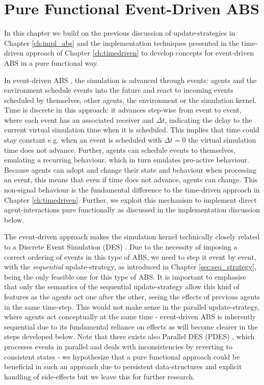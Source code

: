 \chapter{Pure Functional Event-Driven ABS}
\label{ch:eventdriven}

In this chapter we build on the previous discussion of update-strategies in Chapter \ref{ch:impl_abs} and the implementation techniques presented in the time-driven approach of Chapter \ref{ch:timedriven} to develop concepts for event-driven ABS in a pure functional way. 

In event-driven ABS \cite{meyer_event-driven_2014}, the simulation is advanced through events: agents and the environment schedule events into the future and react to incoming events scheduled by themselves, other agents, the environment or the simulation kernel. Time is discrete in this approach: it advances step-wise from event to event, where each event has an associated receiver and $\Delta t$, indicating the delay to the current virtual simulation time when it is scheduled. This implies that time could stay constant e.g. when an event is scheduled with $\Delta t = 0$ the virtual simulation time does not advance. Further, agents can schedule events to themselves, emulating a recurring behaviour, which in turn emulates pro-active behaviour. Because agents can adopt and change their state and behaviour when processing an event, this means that even if time does not advance, agents can change. This non-signal behaviour is the fundamental difference to the time-driven approach in Chapter \ref{ch:timedriven}. Further, we exploit this mechanism to implement direct agent-interactions pure functionally as discussed in the implementation discussion below.

The event-driven approach makes the simulation kernel technically closely related to a Discrete Event Simulation (DES) \cite{zeigler_theory_2000}. Due to the necessity of imposing a correct ordering of events in this type of ABS, we need to step it event by event, with the \textit{sequential} update-strategy, as introduced in Chapter \ref{sec:seq_strategy}, being the only feasible one for this type of ABS. It is important to emphasise that only the semantics of the sequential update-strategy allow this kind of features as the agents act one after the other, seeing the effects of previous agents in the same time-step. This would not make sense in the parallel update-strategy, where agents act conceptually at the same time - event-driven ABS is inherently sequential due to its fundamental reliance on effects as will become clearer in the steps developed below. Note that there exists also Parallel DES (PDES) \cite{fujimoto_parallel_1990}, which processes events in parallel and deals with inconsistencies by reverting to consistent states - we hypothesize that a pure functional approach could be beneficial in such an approach due to persistent data-structures and explicit handling of side-effects but we leave this for further research.

